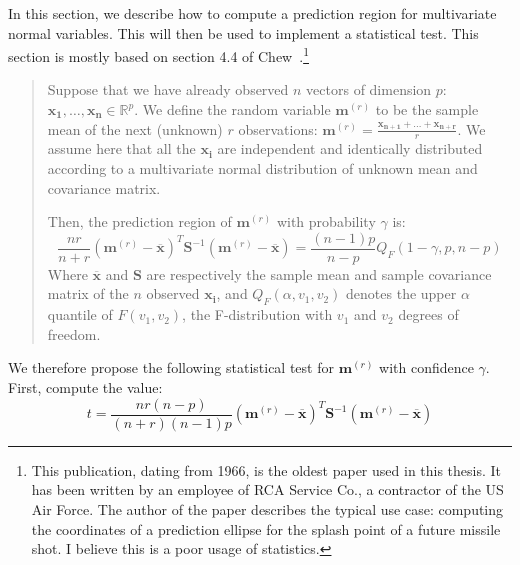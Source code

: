             In this section, we describe how to compute a prediction region for multivariate normal variables. This will
            then be used to implement a statistical test.  This section is mostly based on section 4.4 of
            Chew~\cite{chew}.\footnote{This publication, dating from 1966, is the oldest paper used in this thesis. It
            has been written by an employee of RCA Service Co., a contractor of the US Air Force. The author of the
            paper describes the typical use case: computing the coordinates of a prediction ellipse for the splash point
            of a future missile shot. I believe this is a poor usage of statistics.}
            \begin{quote}
                Suppose that we have already observed \(n\) vectors of dimension \(p\): \(\bm{x_1},\dots,\bm{x_n} \in
                \mathbb{R}^p\). We define the random variable \(\bm{m}^{(r)}\) to be the sample mean of the next (unknown)
                \(r\) observations: \(\bm{m}^{(r)}= \frac{\bm{x_{n+1}}+\dots+\bm{x_{n+r}}}{r}\). We assume here that all the
                \(\bm{x_i}\) are independent and identically distributed according to a multivariate normal distribution
                of unknown mean and covariance matrix.

                Then, the prediction region of \(\bm{m}^{(r)}\) with probability \(\gamma\) is:
                \begin{equation}\label{eqn:experiment:non_regression:pred_region}
                    \frac{nr}{n+r} (\bm{m}^{(r)} - \overline{\bm{x}})^T \bm{S}^{-1}(\bm{m}^{(r)} -
                    \overline{\bm{x}})
                    =
                    \frac{(n-1)p}{n-p} Q_F(1-\gamma, p, n-p)
                \end{equation}
                Where \(\overline{\bm{x}}\) and \(\bm{S}\) are respectively the sample mean and sample covariance matrix of
                the \(n\) observed \(\bm{x_i}\), and \(Q_F(\alpha,v_1,v_2)\) denotes the upper \(\alpha\) quantile of
                \(F(v_1, v_2)\), the F-distribution with \(v_1\) and \(v_2\) degrees of freedom.
            \end{quote}

            We therefore propose the following statistical test for \(\bm{m}^{(r)}\) with confidence \(\gamma\). First,
            compute the value:
            \begin{equation}\label{eqn:experiment:non_regression:test}
                t = \frac{nr(n-p)}{(n+r)(n-1)p} (\bm{m}^{(r)} - \overline{\bm{x}})^T \bm{S}^{-1}(\bm{m}^{(r)} -
                \overline{\bm{x}})
            \end{equation}

